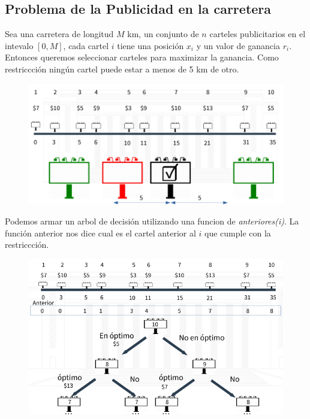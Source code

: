\documentclass{article}
\begin{document}
\newpage
\subsection{Problema de la Publicidad en la carretera}

Sea una carretera de longitud \(M\) km, un conjunto de \(n\) carteles publicitarios en el 
intevalo \([0,M]\), cada cartel \(i\) tiene una posición \(x_i\) y un valor de ganancia \(r_i\).
Entonces queremos seleccionar carteles para maximizar la ganancia. Como restriccción ningún cartel
puede estar a menos de 5 km de otro.

\begin{figure}[h!]
    \includegraphics[scale=0.4]{imagenes/dinamico-ejemplo-ruta.png}
\end{figure}

Podemos armar un arbol de decisión utilizando una funcion de \textit{anteriores(i)}. La función anterior
nos dice cual es el cartel anterior al \(i\) que cumple con la restriccción.

\begin{figure}[h!]
    \includegraphics[scale=0.4]{imagenes/dinamico-ruta-arbol.png}
\end{figure}
\end{document}
